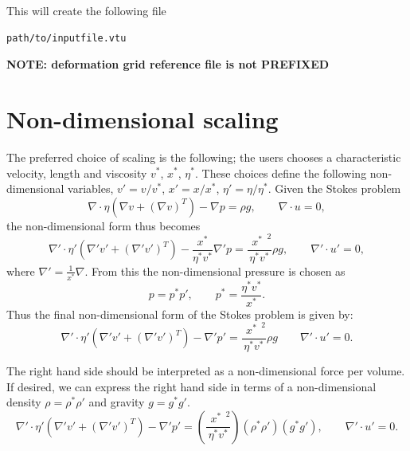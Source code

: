 \documentclass[paper=a4, fontsize=10pt,twoside]{scrartcl}
\begin{document}
{{This will create the following file
\begin{lstlisting}
path/to/inputfile.vtu
\end{lstlisting}

\textbf{NOTE: deformation grid reference file is not PREFIXED}

\section{Non-dimensional scaling}
The preferred choice of scaling is the following; the users chooses a characteristic velocity, length and viscosity $v^*$, $x^*$, $\eta^*$.
These choices define the following non-dimensional variables, $v' = v/v^*$, $x' = x/x^*$, $\eta' = \eta/\eta^*$. Given the Stokes problem
$$
	\nabla \cdot \eta \left( \nabla v + (\nabla v)^T \right) - \nabla p = \rho g,
	\qquad
	\nabla \cdot u = 0,
$$
the non-dimensional form thus becomes
$$
	\nabla' \cdot \eta' \left( \nabla' v' + (\nabla' v')^T \right) - \frac{x^*}{\eta^* v^*} \nabla' p = \frac{\phantom(x^*\phantom)^2}{\eta^* v^*} \rho g,
	\qquad
	\nabla' \cdot u' = 0,
$$
where $\nabla' = \frac{1}{x^*} \nabla$.
From this the non-dimensional pressure is chosen as 
$$
	p = p^* p', \qquad p^* = \frac{\eta^* v^*}{x^*} .
$$
Thus the final non-dimensional form of the Stokes problem is given by:
$$
	\nabla' \cdot \eta' \left( \nabla' v' + (\nabla' v')^T \right) - \nabla' p' 
	= \frac{\phantom(x^*\phantom)^2}{\eta^* v^*} \rho g
	\qquad
	\nabla' \cdot u' = 0.
$$

The right hand side should be interpreted as a non-dimensional force per volume. If desired, we can express the right hand side in terms of a non-dimensional density $\rho = \rho^* \rho'$ and gravity $g = g^* g'$.
$$
	\nabla' \cdot \eta' \left( \nabla' v' + (\nabla' v')^T \right) - \nabla' p' 
	= 	\left( \frac{\phantom(x^*\phantom)^2}{\eta^* v^*}  \right) 
		\left( \rho^* \rho' \right)  \left( g^* g' \right),
	\qquad
	\nabla' \cdot u' = 0.
$$

}}
\end{document}
